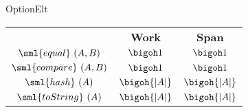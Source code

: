 \begin{costspec}{OptionElt}

\begin{tabular}{c|c|c}
& \textbf{Work} & \textbf{Span} \\
$\sml{equal}~(A,B)$ & $\bigoh 1$ & $\bigoh 1$ \\
$\sml{compare}~(A,B)$ & $\bigoh 1$ & $\bigoh 1$ \\
$\sml{hash}~(A)$ & $\bigoh{|A|} $ & $\bigoh{|A|}$ \\
$\sml{toString}~(A)$ & $\bigoh{|A|}$ & $\bigoh{|A|}$ \\
\end{tabular}
\end{costspec}

